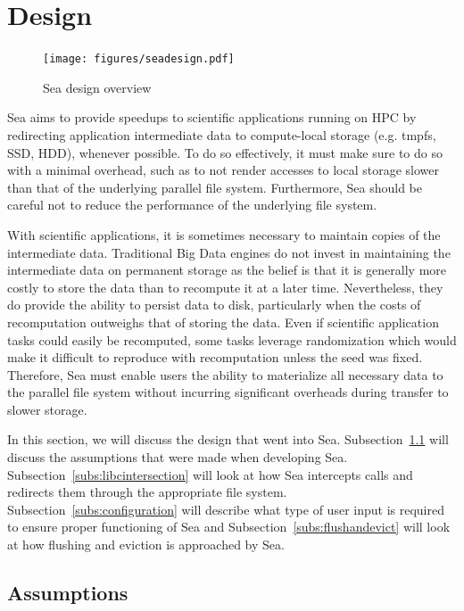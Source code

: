 \documentclass{report}
\begin{document}
   \section{Design}\label{design}
    \begin{figure}
            \centering
            \texttt{[image: figures/seadesign.pdf]}
            \caption{Sea design overview}
    \end{figure}%
   Sea aims to provide speedups to scientific applications running on HPC
   by redirecting application intermediate data to compute-local storage (e.g. tmpfs,
   SSD, HDD), whenever possible.
   To do so effectively, it must make sure to do so with a minimal overhead, such as
   to not render accesses to local storage slower than that of the underlying parallel
   file system. Furthermore, Sea should be careful not to reduce the performance of the
   underlying file system.

   With scientific applications, it is sometimes necessary to maintain copies of
   the intermediate data. Traditional Big Data engines do not invest in maintaining
   the intermediate data on permanent storage as the belief is that it is generally 
   more costly to store the data than to recompute it at a later time. Nevertheless,
   they do provide the ability to persist data to disk, particularly when the 
   costs of recomputation outweighs that of storing the data. Even if scientific application
   tasks could easily be recomputed, some tasks leverage randomization which would make
   it difficult to reproduce with recomputation unless the seed was fixed. Therefore,
   Sea must enable users the ability to materialize all necessary data to the parallel
   file system without incurring significant overheads during transfer to slower storage.

   In this section, we will discuss the design that went into Sea.
   Subsection~\ref{subs:assumption} will discuss the assumptions that were made
   when developing Sea. Subsection~\ref{subs:libcintersection} will look at how
   Sea intercepts calls and redirects them through the appropriate file system.
   Subsection~\ref{subs:configuration} will describe what type of user input
   is required to ensure proper functioning of Sea and Subsection~\ref{subs:flushandevict}
   will look at how flushing and eviction is approached by Sea.

   \subsection{Assumptions}\label{subs:assumption}
\end{document}
